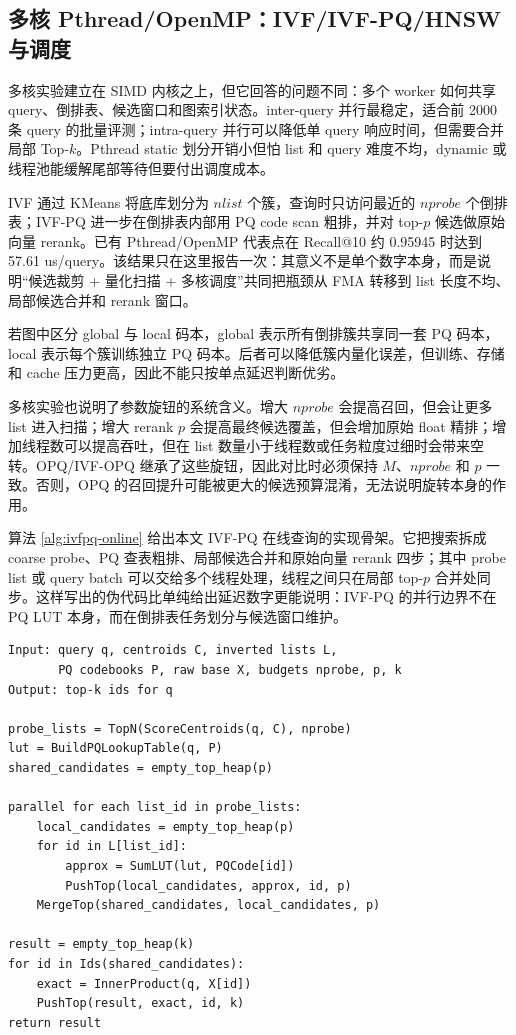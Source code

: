 \documentclass[a4paper,11pt,UTF8]{ctexart}
\begin{document}
\subsection{多核 Pthread/OpenMP：IVF/IVF-PQ/HNSW 与调度}

多核实验建立在 SIMD 内核之上，但它回答的问题不同：多个 worker 如何共享 query、倒排表、候选窗口和图索引状态。inter-query 并行最稳定，适合前 2000 条 query 的批量评测；intra-query 并行可以降低单 query 响应时间，但需要合并局部 Top-$k$。Pthread static 划分开销小但怕 list 和 query 难度不均，dynamic 或线程池能缓解尾部等待但要付出调度成本。

IVF 通过 KMeans 将底库划分为 $nlist$ 个簇，查询时只访问最近的 $nprobe$ 个倒排表；IVF-PQ 进一步在倒排表内部用 PQ code scan 粗排，并对 top-$p$ 候选做原始向量 rerank。已有 Pthread/OpenMP 代表点在 Recall@10 约 0.95945 时达到 57.61 us/query。该结果只在这里报告一次：其意义不是单个数字本身，而是说明“候选裁剪 + 量化扫描 + 多核调度”共同把瓶颈从 FMA 转移到 list 长度不均、局部候选合并和 rerank 窗口。

若图中区分 global 与 local 码本，global 表示所有倒排簇共享同一套 PQ 码本，local 表示每个簇训练独立 PQ 码本。后者可以降低簇内量化误差，但训练、存储和 cache 压力更高，因此不能只按单点延迟判断优劣。

多核实验也说明了参数旋钮的系统含义。增大 $nprobe$ 会提高召回，但会让更多 list 进入扫描；增大 rerank $p$ 会提高最终候选覆盖，但会增加原始 float 精排；增加线程数可以提高吞吐，但在 list 数量小于线程数或任务粒度过细时会带来空转。OPQ/IVF-OPQ 继承了这些旋钮，因此对比时必须保持 $M$、$nprobe$ 和 $p$ 一致。否则，OPQ 的召回提升可能被更大的候选预算混淆，无法说明旋转本身的作用。

算法 \ref{alg:ivfpq-online} 给出本文 IVF-PQ 在线查询的实现骨架。它把搜索拆成 coarse probe、PQ 查表粗排、局部候选合并和原始向量 rerank 四步；其中 probe list 或 query batch 可以交给多个线程处理，线程之间只在局部 top-$p$ 合并处同步。这样写出的伪代码比单纯给出延迟数字更能说明：IVF-PQ 的并行边界不在 PQ LUT 本身，而在倒排表任务划分与候选窗口维护。

\begin{lstlisting}[caption={IVF-PQ online search with threaded candidate scan},label={alg:ivfpq-online},basicstyle=\ttfamily\scriptsize]
Input: query q, centroids C, inverted lists L,
       PQ codebooks P, raw base X, budgets nprobe, p, k
Output: top-k ids for q

probe_lists = TopN(ScoreCentroids(q, C), nprobe)
lut = BuildPQLookupTable(q, P)
shared_candidates = empty_top_heap(p)

parallel for each list_id in probe_lists:
    local_candidates = empty_top_heap(p)
    for id in L[list_id]:
        approx = SumLUT(lut, PQCode[id])
        PushTop(local_candidates, approx, id, p)
    MergeTop(shared_candidates, local_candidates, p)

result = empty_top_heap(k)
for id in Ids(shared_candidates):
    exact = InnerProduct(q, X[id])
    PushTop(result, exact, id, k)
return result
\end{lstlisting}
\end{document}
